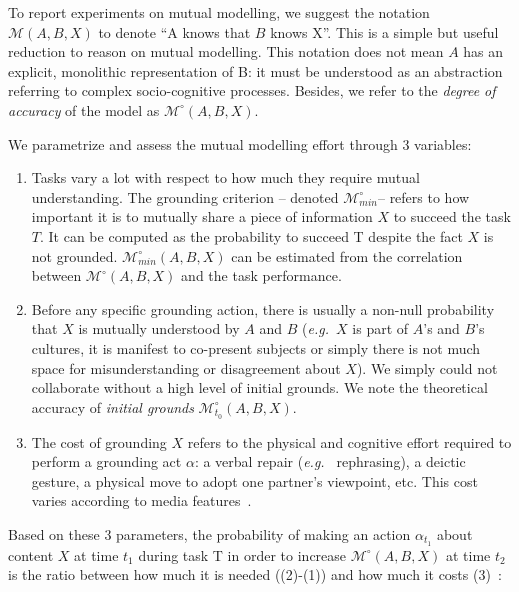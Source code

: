 \documentclass[twocolumn]{article}
\newcommand{\eg}{{\textit{e.g.\ }}}
\newcommand{\model}[3]{{$\mathcal{M}(#1, #2, #3)$}}
\newcommand{\Model}[3]{{$\mathcal{M}^{\circ}(#1, #2, #3)$}}
\newcommand{\groundingcriterion}{{$\mathcal{M}^{\circ}_{min}$}}
\begin{document}
To report experiments on mutual modelling, we suggest
the notation \model{A}{B}{X} to denote ``A knows that $B$ knows X''. This is a
simple but useful reduction to reason on mutual modelling. This
notation does not mean $A$ has an explicit, monolithic representation of B: it
must be understood as an abstraction referring to complex socio-cognitive
processes. Besides, we refer to the \emph{degree of accuracy} of the model as
\Model{A}{B}{X}.

We parametrize and assess the mutual modelling effort through 3 variables:

\begin{enumerate}

    \item Tasks vary a lot with respect to how much they require mutual
        understanding.  The grounding
        criterion -- denoted \groundingcriterion -- refers to how
        important it is to mutually share a piece of information $X$ to succeed
        the task $T$. It can be computed as the probability to succeed T despite
        the fact $X$ is not grounded. $\mathcal{M}^{\circ}_{min}(A,B,X)$ can be
        estimated from the correlation between \Model{A}{B}{X} and the task
        performance. 

    \item Before any specific grounding action, there is usually a non-null probability
        that $X$ is mutually understood by $A$ and $B$ (\eg $X$
        is part of $A$'s and $B$'s cultures, it is manifest to co-present
        subjects or simply there is not much space for misunderstanding
        or disagreement about $X$). We simply could not collaborate without a high level of initial
        grounds. We note the theoretical accuracy of \emph{initial grounds}
        $\mathcal{M}^{\circ}_{t_0}(A,B,X)$.

    \item The cost of grounding $X$ refers to the physical and cognitive effort
        required to perform a grounding act $\alpha$: a verbal repair (\eg
        rephrasing), a deictic gesture, a physical move to adopt one partner's
        viewpoint, etc. This cost varies according to media
        features~\cite{clark1991grounding}.

\end{enumerate}

Based on these 3 parameters, the probability of making an action $\alpha_{t_1}$ about
content $X$ at time $t_1$ during task T in order to increase \Model{A}{B}{X}
at time $t_2$ is the ratio between how much it is needed  ((2)-(1)) and how much it
costs (3)~\citep{traum1996miscommunication}:
\end{document}

